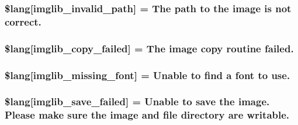 \subsubsection[{\$lang}]{\setlength{\rightskip}{0pt plus 5cm}\$lang\mbox{[}\textquotesingle{}imglib\+\_\+invalid\+\_\+path\textquotesingle{}\mbox{]} = \textquotesingle{}The path to the image is not correct.\textquotesingle{}}\label{_admin_2system_2language_2english_2imglib__lang_8php_a8ff486c25806a4731d1ffe20431df825}
\hypertarget{_admin_2system_2language_2english_2imglib__lang_8php_a9363000d2005b8276b39d581a11b562d}{}
\subsubsection[{\$lang}]{\setlength{\rightskip}{0pt plus 5cm}\$lang\mbox{[}\textquotesingle{}imglib\+\_\+copy\+\_\+failed\textquotesingle{}\mbox{]} = \textquotesingle{}The image copy routine failed.\textquotesingle{}}\label{_admin_2system_2language_2english_2imglib__lang_8php_a9363000d2005b8276b39d581a11b562d}
\hypertarget{_admin_2system_2language_2english_2imglib__lang_8php_a935800aad2be18ca4fe99bb074674848}{}
\subsubsection[{\$lang}]{\setlength{\rightskip}{0pt plus 5cm}\$lang\mbox{[}\textquotesingle{}imglib\+\_\+missing\+\_\+font\textquotesingle{}\mbox{]} = \textquotesingle{}Unable to find {\bf a} font to use.\textquotesingle{}}\label{_admin_2system_2language_2english_2imglib__lang_8php_a935800aad2be18ca4fe99bb074674848}
\hypertarget{_admin_2system_2language_2english_2imglib__lang_8php_a4d7a99fddc60c97a7327fa0125dea264}{}
\subsubsection[{\$lang}]{\setlength{\rightskip}{0pt plus 5cm}\$lang\mbox{[}\textquotesingle{}imglib\+\_\+save\+\_\+failed\textquotesingle{}\mbox{]} = \textquotesingle{}Unable to save the image. Please make sure the image and file directory are writable.\textquotesingle{}}\label{_admin_2system_2language_2english_2imglib__lang_8php_a4d7a99fddc60c97a7327fa0125dea264}
